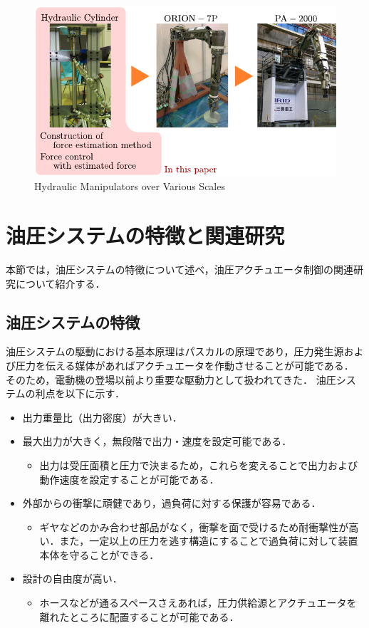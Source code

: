 \begin{figure}[t]
    \centering
        \includegraphics[keepaspectratio, scale=1.0]{contents/緒言/figure/approach_thiswork.pdf}
        \caption{Hydraulic Manipulators over Various Scales}
        \label{fig:approach_thiswork}
\end{figure}

\section{油圧システムの特徴と関連研究}
本節では，油圧システムの特徴について述べ，油圧アクチュエータ制御の関連研究について紹介する．
\subsection{油圧システムの特徴}

油圧システムの駆動における基本原理はパスカルの原理\cite{PascalsLaw}であり，圧力発生源および圧力を伝える媒体があればアクチュエータを作動させることが可能である．
そのため，電動機の登場以前より重要な駆動力として扱われてきた．
油圧システムの利点を以下に示す\cite{jelali2012hydraulic,不二越ハイドロニクスチーム199305}．
\begin{itemize}
    \item 出力重量比（出力密度）が大きい．
    \item 最大出力が大きく，無段階で出力・速度を設定可能である．
    \begin{itemize}
        \item 出力は受圧面積と圧力で決まるため，これらを変えることで出力および動作速度を設定することが可能である．
    \end{itemize}
    \item 外部からの衝撃に頑健であり，過負荷に対する保護が容易である．
    \begin{itemize}
        \item ギヤなどのかみ合わせ部品がなく，衝撃を面で受けるため耐衝撃性が高い．また，一定以上の圧力を逃す構造にすることで過負荷に対して装置本体を守ることができる．
    \end{itemize}
    \item 設計の自由度が高い．
    \begin{itemize}
        \item ホースなどが通るスペースさえあれば，圧力供給源とアクチュエータを離れたところに配置することが可能である．
    \end{itemize}
\end{itemize}

